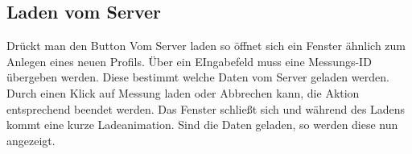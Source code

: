 	

	


	
		\subsection{Laden vom Server}
		\label{subsec:load-srv}
Drückt man den Button \glqq Vom Server laden\grqq{} so öffnet sich ein Fenster ähnlich zum Anlegen eines neuen Profils. Über ein EIngabefeld muss eine Messungs-ID übergeben werden. Diese bestimmt welche Daten vom Server geladen werden. Durch einen Klick auf \glqq Messung laden \grqq{} oder \glqq Abbrechen \grqq{} kann, die Aktion entsprechend beendet werden. Das Fenster schließt sich und während des Ladens kommt eine kurze Ladeanimation. Sind die Daten geladen, so werden diese nun angezeigt.\\
		
